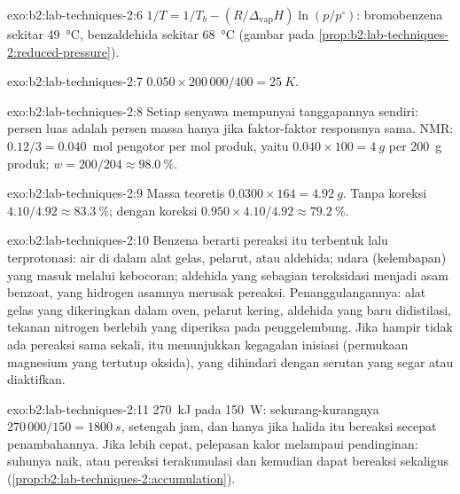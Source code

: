 \begin{solution}{exo:b2:lab-techniques-2:6}
$1/T = 1/T_b - (R/\Delta_{\mathrm{vap}}H)\ln(p/p^\circ)$: bromobenzena sekitar \qty{49}{\degreeCelsius},
benzaldehida sekitar \qty{68}{\degreeCelsius} (gambar pada \cref{prop:b2:lab-techniques-2:reduced-pressure}).
\end{solution}

\begin{solution}{exo:b2:lab-techniques-2:7}
$0.050 \times 200\,000/400 = \qty{25}{K}$.
\end{solution}

\begin{solution}{exo:b2:lab-techniques-2:8}
Setiap senyawa mempunyai tanggapannya sendiri: persen luas adalah persen
massa hanya jika faktor-faktor responsnya sama. NMR: $0.12/3 = 0.040$~mol
pengotor per mol produk, yaitu $0.040 \times 100 = \qty{4}{g}$
per \qty{200}{g} produk; $w = 200/204 \approx 98.0~\%$.
\end{solution}

\begin{solution}{exo:b2:lab-techniques-2:9}
Massa teoretis $0.0300 \times 164 = \qty{4.92}{g}$. Tanpa koreksi $4.10/4.92 \approx 83.3~\%$; dengan koreksi
$0.950 \times 4.10/4.92 \approx 79.2~\%$.
\end{solution}

\begin{solution}{exo:b2:lab-techniques-2:10}
Benzena berarti pereaksi itu terbentuk lalu terprotonasi: air di dalam alat
gelas, pelarut, atau aldehida; udara (kelembapan) yang masuk melalui
kebocoran; aldehida yang sebagian teroksidasi menjadi asam benzoat, yang
hidrogen asamnya merusak pereaksi. Penanggulangannya: alat gelas yang
dikeringkan dalam oven, pelarut kering, aldehida yang baru didistilasi,
tekanan nitrogen berlebih yang diperiksa pada penggelembung. Jika hampir
tidak ada pereaksi sama sekali, itu menunjukkan kegagalan inisiasi
(permukaan magnesium yang tertutup oksida), yang dihindari dengan serutan
yang segar atau diaktifkan.
\end{solution}

\begin{solution}{exo:b2:lab-techniques-2:11}
\qty{270}{kJ} pada \qty{150}{W}: sekurang-kurangnya $270\,000/150 = \qty{1800}{s}$,
setengah jam, dan hanya jika halida itu bereaksi secepat penambahannya.
Jika lebih cepat, pelepasan kalor melampaui pendinginan: suhunya naik, atau
pereaksi terakumulasi dan kemudian dapat bereaksi sekaligus
(\cref{prop:b2:lab-techniques-2:accumulation}).
\end{solution}

